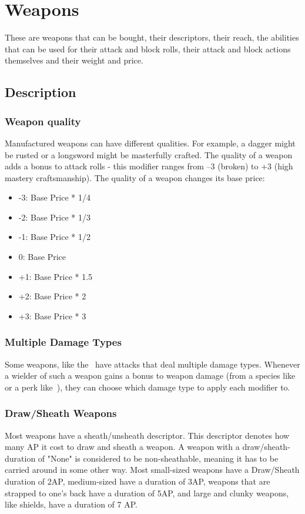 \chapter{Weapons}\label{ch:weapons}
These are weapons that can be bought, their descriptors, their reach, the abilities that can be used for their attack and block rolls, their attack and block actions themselves and their weight and price.\\
\section{Description}\label{sec:weaponDescription}
\subsection{Weapon quality}\label{subsec:weaponQuality}
Manufactured weapons can have different qualities.
For example, a dagger might be rusted or a longsword might be masterfully crafted.
The quality of a weapon adds a bonus to attack rolls - this modifier ranges from --3 (broken) to +3 (high mastery craftsmanship).
The quality of a weapon changes its base price:\\

\begin{itemize}
    \item -3: Base Price * 1/4
    \item -2: Base Price * 1/3
    \item -1: Base Price * 1/2
    \item 0: Base Price
    \item +1: Base Price * 1.5
    \item +2: Base Price * 2
    \item +3: Base Price * 3
\end{itemize}

\subsection{Multiple Damage Types}\label{subsec:multipleDamageTypeWeapons}
Some weapons, like the~ have attacks that deal multiple damage types.
Whenever a wielder of such a weapon gains a bonus to weapon damage (from a species like~ or a perk like~), they can choose which damage type to apply each modifier to.

\subsection{Draw/Sheath Weapons}\label{subsec:sheathWeapons}
Most weapons have a sheath/unsheath descriptor.
This descriptor denotes how many AP it cost to draw and sheath a weapon.
A weapon with a draw/sheath-duration of "None" is considered to be non-sheathable, meaning it has to be carried around in some other way.
Most small-sized weapons have a Draw/Sheath duration of 2AP, medium-sized have a duration of 3AP, weapons that are strapped to one's back have a duration of 5AP, and large and clunky weapons, like shields, have a duration of 7 AP.

